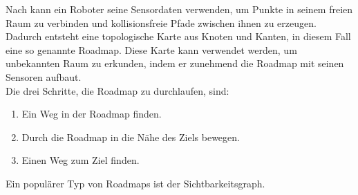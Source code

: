 %
Nach \cite{Principles:05} kann ein Roboter seine Sensordaten verwenden, um Punkte in seinem freien Raum zu verbinden und kollisionsfreie Pfade zwischen ihnen zu erzeugen. Dadurch entsteht eine topologische Karte aus Knoten und Kanten, in diesem Fall eine so genannte Roadmap. Diese Karte kann verwendet werden, um unbekannten Raum zu erkunden, indem er zunehmend die Roadmap mit seinen Sensoren aufbaut.\\
Die drei Schritte, die Roadmap zu durchlaufen, sind: 
\begin{enumerate}
	\item Ein Weg in der Roadmap finden.
	\item Durch die Roadmap in die Nähe des Ziels bewegen.
	\item Einen Weg zum Ziel finden.
\end{enumerate}
Ein populärer Typ von Roadmaps ist der Sichtbarkeitsgraph.


